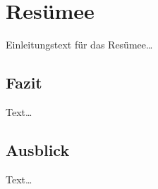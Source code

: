 \chapter{Resümee}
\label{ch:resumee}

Einleitungstext für das Resümee\dots

\section{Fazit}
\label{sec:fazit}

Text\dots

\section{Ausblick}
\label{sec:ausblick}

Text\dots
